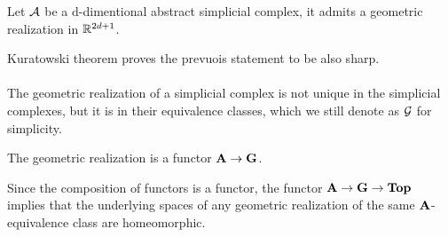 \documentclass[../1.tex]{subfiles}
\begin{document}
    \begin{thm}
        Let $\mathcal{A}$ be a d-dimentional abstract simplicial complex, it admits a geometric realization in $\mathbb{R}^{2d+1}$.
    \end{thm}
    Kuratowski theorem proves the prevuois statement to be also sharp.\\
    \hfill \\
    The geometric realization of a simplicial complex is not unique in the simplicial complexes, but it is in their
    equivalence classes, which we still denote as $\mathcal{G}$ for simplicity.

    \begin{thm}
        The geometric realization is a functor $\textbf{A} \to \textbf{G}$.
    \end{thm}

    Since the composition of functors is a functor, the functor $\textbf{A} \to \textbf{G} \to \textbf{Top}$ implies that the underlying spaces
    of any geometric realization of the same $\textbf{A}$-equivalence class are homeomorphic.
\end{document}
